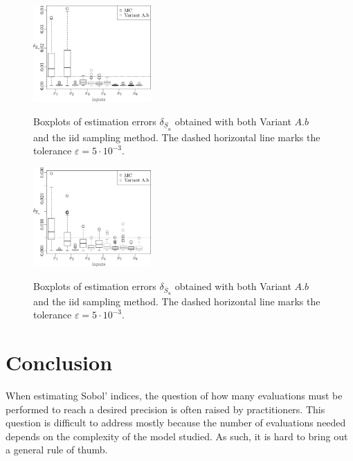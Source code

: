 \begin{figure}[t]
\caption{Boxplots of estimation errors $\delta_{\underline{S}_u}$ obtained with both Variant $A.b$ and the iid sampling method. The dashed horizontal line marks the tolerance $\varepsilon=5\cdot 10^{-3}$.}
\centering
\vspace*{0.2cm}
\includegraphics[width=0.4\textwidth]{Fig5.eps}
\label{compa_MC_first}
\end{figure}

\begin{figure}[t]
\caption{Boxplots of estimation errors $\delta_{\overline{S}_u}$ obtained with both Variant $A.b$ and the iid sampling method. The dashed horizontal line marks the tolerance $\varepsilon=5\cdot 10^{-3}$.}
\centering
\vspace*{0.2cm}
\includegraphics[width=0.4\textwidth]{Fig6.eps}
\label{compa_MC_tot}
\end{figure}


\section{Conclusion}
When estimating Sobol' indices, the question of how many evaluations must be performed to reach a desired precision is often raised by practitioners. This question is difficult to address mostly because the number of evaluations needed depends on the complexity of the model studied. As such, it is hard to bring out a general rule of thumb. 

